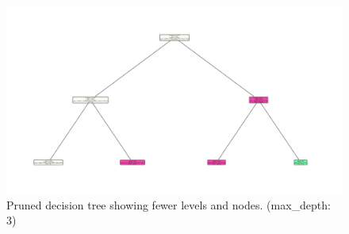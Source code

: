 \begin{figure}[H]
    \centering
    \includegraphics[width=0.8\columnwidth]{images/simple_tree.png}
    \caption{Pruned decision tree showing fewer levels and nodes. (max\_depth: 3)}
    \label{fig:simple_tree}
\end{figure}

